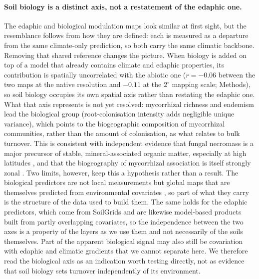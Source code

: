 \documentclass[12pt, a4paper]{article}
\begin{document}
\paragraph{Soil biology is a distinct axis, not a restatement of the edaphic one.}
The edaphic and biological modulation maps look similar at first sight, but the
resemblance follows from how they are defined: each is measured as a departure from
the same climate-only prediction, so both carry the same climatic backbone. Removing
that shared reference changes the picture. When biology is added on top of a model
that already contains climate and edaphic properties, its contribution is spatially
uncorrelated with the abiotic one ($r=-0.06$ between the two maps at the native
resolution and $-0.11$ at the $2^{\circ}$ mapping scale; Methods), so
soil biology occupies its own spatial axis rather than restating the edaphic one. What that axis represents is
not yet resolved: mycorrhizal richness and endemism lead the biological group
(root-colonisation intensity adds negligible unique variance), which points to the
biogeographic composition of mycorrhizal communities, rather than the amount of
colonisation, as what relates to bulk turnover. This is consistent with independent
evidence that fungal necromass is a major precursor of stable, mineral-associated
organic matter, especially at high latitudes \citep{Clemmensen2013,Averill2014,Frey2019}, and that the biogeography of mycorrhizal association is itself
strongly zonal \citep{Tedersoo2014,Steidinger2019}. Two limits, however, keep this a
hypothesis rather than a result. The biological predictors are not local
measurements but global maps that are themselves predicted from environmental
covariates \citep{Yu2022,Barcelo2023,VanNuland2025}, so part of what they carry is
the structure of the data used to build them. The same holds for the edaphic
predictors, which come from SoilGrids \citep{Poggio2021} and are likewise
model-based products built from partly overlapping covariates, so the independence
between the two axes is a property of the layers as we use them and not necessarily
of the soils themselves. Part of the apparent biological signal may also still
be covariation with edaphic and climatic gradients that we cannot separate here. We
therefore read the biological axis as an indication worth testing directly, not as
evidence that soil biology sets turnover independently of its environment.
\end{document}
